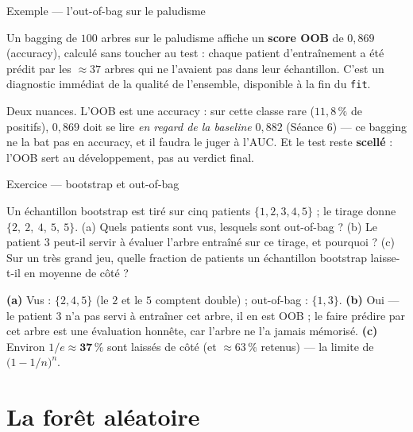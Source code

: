 \documentclass[aspectratio=169,11pt]{beamer}
\begin{document}
\begin{frame}{Exemple — l'out-of-bag sur le paludisme}
\begin{ucadex}
{\small Un bagging de $100$ arbres sur le paludisme affiche un \textbf{score OOB} de $0{,}869$ (accuracy), calculé sans toucher au test : chaque patient d'entraînement a été prédit par les $\approx 37$ arbres qui ne l'avaient pas dans leur échantillon. C'est un diagnostic immédiat de la qualité de l'ensemble, disponible à la fin du \texttt{fit}.}
\end{ucadex}
{\small Deux nuances. L'OOB est une accuracy : sur cette classe rare ($11{,}8\,\%$ de positifs), $0{,}869$ doit se lire \emph{en regard de la baseline} $0{,}882$ (Séance 6) — ce bagging ne la bat pas en accuracy, et il faudra le juger à l'AUC. Et le test reste \textbf{scellé} : l'OOB sert au développement, pas au verdict final.}
\end{frame}

\begin{frame}{Exercice — bootstrap et out-of-bag}
\begin{ucadrec}[Énoncé]
{\small Un échantillon bootstrap est tiré sur cinq patients $\{1,2,3,4,5\}$ ; le tirage donne $\{2,\ 2,\ 4,\ 5,\ 5\}$. (a) Quels patients sont vus, lesquels sont out-of-bag ? (b) Le patient $3$ peut-il servir à évaluer l'arbre entraîné sur ce tirage, et pourquoi ? (c) Sur un très grand jeu, quelle fraction de patients un échantillon bootstrap laisse-t-il en moyenne de côté ?}
\end{ucadrec}
\pause
\begin{ucadex}[Correction]
{\small \textbf{(a)} Vus : $\{2, 4, 5\}$ (le $2$ et le $5$ comptent double) ; out-of-bag : $\{1, 3\}$. \textbf{(b)} Oui — le patient $3$ n'a pas servi à entraîner cet arbre, il en est OOB ; le faire prédire par cet arbre est une évaluation honnête, car l'arbre ne l'a jamais mémorisé. \textbf{(c)} Environ $1/e \approx \mathbf{37\,\%}$ sont laissés de côté (et $\approx 63\,\%$ retenus) — la limite de $\big(1 - 1/n\big)^n$.}
\end{ucadex}
\end{frame}

\section{La forêt aléatoire}
\end{document}
